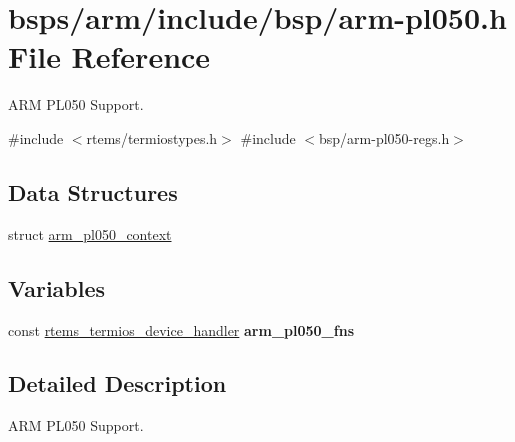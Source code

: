 \hypertarget{arm-pl050_8h}{}\section{bsps/arm/include/bsp/arm-\/pl050.h File Reference}
\label{arm-pl050_8h}


A\+RM P\+L050 Support.  


{\ttfamily \#include $<$rtems/termiostypes.\+h$>$}\newline
{\ttfamily \#include $<$bsp/arm-\/pl050-\/regs.\+h$>$}\newline
\subsection*{Data Structures}
\begin{DoxyCompactItemize}
\item 
struct \mbox{\hyperlink{structarm__pl050__context}{arm\+\_\+pl050\+\_\+context}}
\end{DoxyCompactItemize}
\subsection*{Variables}
\begin{DoxyCompactItemize}
\item 
\mbox{\label{arm-pl050_8h_a10f9d562d62493803da05848f54cfa8b}} 
const \mbox{\hyperlink{structrtems__termios__device__handler}{rtems\+\_\+termios\+\_\+device\+\_\+handler}} {\bfseries arm\+\_\+pl050\+\_\+fns}
\end{DoxyCompactItemize}


\subsection{Detailed Description}
A\+RM P\+L050 Support. 


